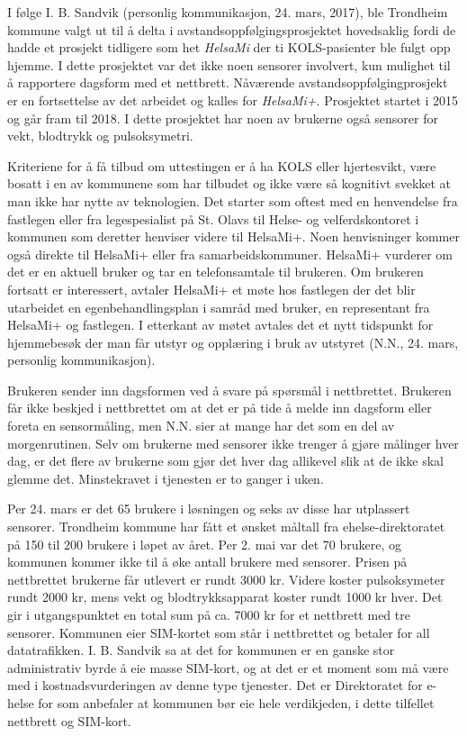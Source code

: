 I følge I. B. Sandvik (personlig kommunikasjon, 24. mars, 2017), ble Trondheim kommune valgt ut til å delta i avstandsoppfølgingsprosjektet hovedsaklig fordi de hadde et
prosjekt tidligere som het \textit{HelsaMi} der ti KOLS-pasienter ble fulgt opp hjemme. I dette prosjektet var det ikke noen sensorer involvert,
kun mulighet til å rapportere dagsform med et nettbrett. Nåværende avstandsoppfølgingprosjekt er en fortsettelse av det arbeidet
og kalles for \textit{HelsaMi+}. Prosjektet startet i 2015 og går fram til 2018. I dette prosjektet har noen av brukerne også sensorer
for vekt, blodtrykk og pulsoksymetri.

Kriteriene for å få tilbud om uttestingen er å ha KOLS eller hjertesvikt, være bosatt i en av kommunene som har tilbudet og ikke være så kognitivt
svekket at man ikke har nytte av teknologien. Det starter som oftest med en henvendelse fra fastlegen eller fra legespesialist på St. Olavs
til Helse- og velferdskontoret i kommunen som deretter
henviser videre til HelsaMi+. Noen henvisninger kommer også direkte til HelsaMi+ eller fra samarbeidskommuner. HelsaMi+ vurderer om det er en aktuell
bruker og tar en telefonsamtale til brukeren. Om brukeren fortsatt er interessert, avtaler HelsaMi+ et møte hos fastlegen der det blir utarbeidet en
egenbehandlingsplan i samråd med bruker, en representant fra HelsaMi+ og fastlegen. I etterkant av møtet avtales det et nytt tidspunkt for
hjemmebesøk der man får utstyr og opplæring i bruk av utstyret (N.N., 24. mars, personlig kommunikasjon).

Brukeren sender inn dagsformen ved å svare på spørsmål i nettbrettet.  Brukeren får ikke beskjed i nettbrettet om at det er på tide å melde inn dagsform eller foreta en sensormåling, men N.N. 
sier at mange har det som en del av morgenrutinen. Selv om brukerne med sensorer ikke trenger å gjøre målinger hver dag, er det flere av brukerne
som gjør det hver dag allikevel slik at de ikke skal glemme det. Minstekravet i tjenesten er to ganger i uken.

Per 24. mars er det 65 brukere i løsningen og seks av disse har utplassert sensorer. Trondheim kommune har fått et ønsket måltall fra
ehelse-direktoratet på 150 til 200 brukere i løpet av året. Per 2. mai var det 70 brukere, og kommunen kommer ikke til å øke antall
brukere med sensorer.
Prisen på nettbrettet brukerne får utlevert er rundt 3000 kr. Videre koster
pulsoksymeter rundt 2000 kr, mens vekt og blodtrykksapparat koster rundt 1000 kr hver. Det gir i utgangspunktet en total sum på ca. 7000 kr
for et nettbrett med tre sensorer. Kommunen eier SIM-kortet som står i nettbrettet og betaler for all datatrafikken. I. B. Sandvik sa at
det for kommunen er en ganske stor administrativ byrde å eie masse SIM-kort, og at det er et moment som må være med i kostnadsvurderingen
av denne type tjenester. Det er Direktoratet for e-helse for som anbefaler at kommunen bør eie hele verdikjeden, i dette tilfellet nettbrett
og SIM-kort.

